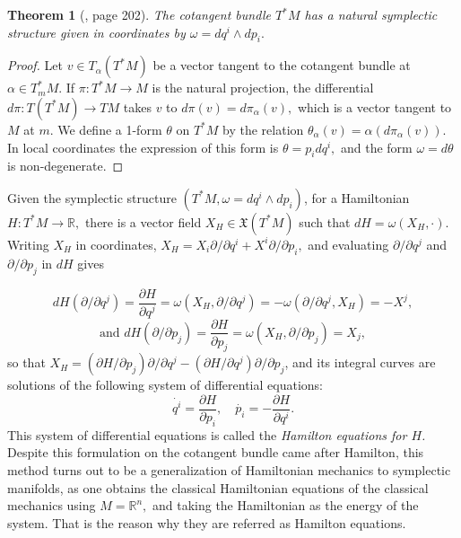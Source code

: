 \documentclass[12pt, letterpaper, reqno]{amsart}
\theoremstyle{definition}
\theoremstyle{plain}
\newtheorem{thm}{Theorem}
\theoremstyle{remark}
\begin{document}
\begin{thm}[\cite{arnol2013mathematical}, page 202]
	The cotangent bundle $ T^*M $ has a natural symplectic structure given in coordinates by $\omega = dq^i\wedge dp_i.$
\end{thm}

\begin{proof}
	Let $ v\in T_\alpha \left( T^*M \right)  $ be a vector tangent to the cotangent bundle at $ \alpha\in T^*_m M. $ If $ \pi:T^*M \rightarrow M $ is the natural projection, the differential $ d\pi : T \left( T^*M \right) \rightarrow TM $ takes $ v $ to $ d\pi(v)=d\pi_\alpha(v), $ which is a vector tangent to $ M $ at $ m. $ We define a 1-form $ \theta $ on $ T^*M $ by the relation $ \theta_\alpha(v)=\alpha(d\pi_\alpha(v)). $ In local coordinates the expression of this form is $ \theta= p_i dq^i, $ and the form $ \omega = d\theta $ is non-degenerate. 
\end{proof}

Given the symplectic structure $ (T^*M, \omega = dq^i\wedge dp_i) $, for a Hamiltonian $ H: T^*M \rightarrow \mathbb{R}, $ there is a vector field $ X_H \in \mathfrak{X}(T^*M) $ such that $ dH = \omega (X_H,\cdot) $. Writing $ X_H $ in coordinates, $ X_H = X_i \partial/\partial q^i + X^i \partial/\partial p_i, $ and evaluating $ \partial/\partial q^j $ and $ \partial/\partial p_j $ in $ dH $ gives  

$$ dH(\partial/\partial q^j) = \frac{\partial H}{\partial q^j} = \omega(X_H, \partial/\partial q^j) = -\omega(\partial/\partial q^j, X_H) = -X^j,$$ 
$$\text{and } dH(\partial/\partial p_j) = \frac{\partial H}{\partial p_j} =\omega(X_H, \partial/\partial p_j)=X_j, $$ 
so that $ X_H = (\partial H/\partial p_j)\partial/\partial q^j - (\partial H / \partial q^j)\partial/\partial p_j $, and its integral curves are solutions of the following system of differential equations:
\begin{equation}\label{eq:hamilton_equations}
 \dot{q^i} = \frac{\partial H}{\partial p_i}, \quad \dot{p_i} =- \frac{\partial H}{\partial q^i}.    
\end{equation}
This system of differential equations is called the \textit{Hamilton equations for $ H $.} Despite this formulation on the cotangent bundle came after Hamilton, this method turns out to be a generalization of Hamiltonian mechanics to symplectic manifolds, as one obtains the classical Hamiltonian equations of the classical mechanics using $ M= \mathbb{R}^n, $ and taking the Hamiltonian as the energy of the system. That is the reason why they are referred as Hamilton equations.
\end{document}
